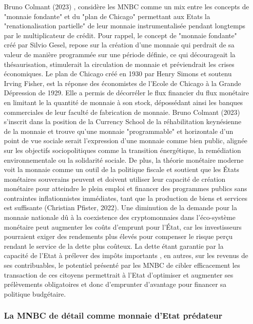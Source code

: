 \documentclass[12pt]{article}
\begin{document}
Bruno Colmant (2023) \cite{colmant_monnaie_2023}, considère les MNBC comme un mix entre les concepts de "monnaie fondante" et du "plan de Chicago" permettant aux Etats la "renationalisation partielle" de leur monnaie instrumentalisée pendant longtemps par le multiplicateur de crédit. Pour rappel, le concept de "monnaie fondante" créé par Silvio Gesel, repose sur la création d'une monnaie qui perdrait de sa valeur de manière programmée sur une période définie, ce qui décourageait la thésaurisation, stimulerait la circulation de monnaie et préviendrait les crises économiques. Le plan de Chicago créé en 1930 par Henry Simons et soutenu Irving Fisher, est la réponse des économistes de l'Ecole de Chicago à la Grande Dépression de 1929. Elle a permis de décorréler le flux financier du flux monétaire en limitant le la quantité de monnaie à son stock, dépossédant ainsi les banques commerciales de leur faculté de fabrication de monnaie. Bruno Colmant (2023) s'inscrit dans la position de la Currency School de la réhabilitation keynésienne de la monnaie et trouve qu'une monnaie "programmable" et horizontale d'un point de vue sociale serait l'expression d'une monnaie comme bien public, alignée sur les objectifs sociopolitiques comme la transition énergétique, la remédiation environnementale ou la solidarité sociale. De plus, la théorie monétaire moderne voit la monnaie comme un outil de la politique fiscale et soutient que les États monétaires souverains peuvent et doivent utiliser leur capacité de création monétaire pour atteindre le plein emploi et financer des programmes publics sans contraintes inflationnistes immédiates, tant que la production de biens et services est suffisante (Christian Pfister, 2022). Une diminution de la demande pour la monnaie nationale dû à la coexistence des cryptomonnaies dans l'éco-système monétaire peut augmenter les coûts d'emprunt pour l'État, car les investisseurs pourraient exiger des rendements plus élevés pour compenser le risque perçu rendant le service de la dette plus coûteux. La dette étant garantie par la capacité de l'Etat à prélever des impôts importants , en autres, sur les revenus de ses contribuables, le potentiel présenté par les MNBC de cibler efficacement les transaction de ces citoyens permettrait à l'Etat d'optimiser et augmenter ses prélèvements obligatoires et donc d'emprunter d'avantage pour financer sa politique budgétaire. \\


\subsubsection{La MNBC de détail comme monnaie d'Etat prédateur}
\end{document}
